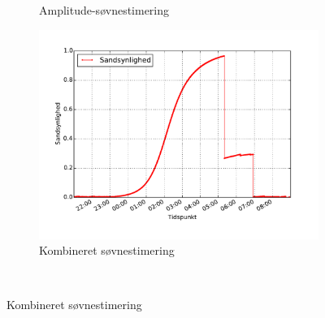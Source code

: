 \begin{frame}
\begin{figure}
\begin{minipage}{\linewidth}
\begin{subfigure}{0.32\linewidth}
			\caption{Amplitude-søvnestimering}\label{fig:sleepcalcamplplot}
		\end{subfigure}
		\begin{subfigure}{0.32\linewidth}
			\centering
			\includegraphics[scale=0.2, trim = 1cm 1cm 1cm 1cm, clip]{../Report/grafik/kombi_figur/combined-sleep-estimate-plot}
			\caption{Kombineret søvnestimering}\label{fig:sleepcalcombine}
		\end{subfigure}
	\end{minipage}\\[1ex]%
\end{figure}
\end{frame}

